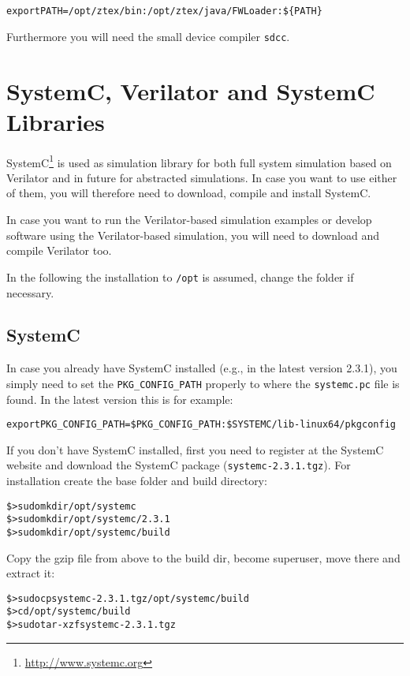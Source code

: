 \begin{alltt}
export PATH=/opt/ztex/bin:/opt/ztex/java/FWLoader:\$\{PATH\}
\end{alltt}

Furthermore you will need the small device compiler \verb|sdcc|.

\section{SystemC, Verilator and SystemC Libraries}

SystemC\footnote{\url{http://www.systemc.org}} is used as simulation
library for both full system simulation based on Verilator and in
future for abstracted simulations. In case you want to use either of
them, you will therefore need to download, compile and install
SystemC.

In case you want to run the Verilator-based simulation examples or
develop software using the Verilator-based simulation, you will need
to download and compile Verilator too.

In the following the installation to \verb|/opt| is assumed, change
the folder if necessary.

\subsection{SystemC}

In case you already have SystemC installed (e.g., in the latest
version 2.3.1), you simply need to set the \verb|PKG_CONFIG_PATH|
properly to where the \verb|systemc.pc| file is found. In the latest
version this is for example:

\begin{alltt}
export PKG_CONFIG_PATH=\$PKG_CONFIG_PATH:\$SYSTEMC/lib-linux64/pkgconfig
\end{alltt}

If you don't have SystemC installed, first you need to register at the
SystemC website and download the SystemC package
(\verb|systemc-2.3.1.tgz|). For installation create the base folder
and build directory:

\begin{alltt}
\$> sudo mkdir /opt/systemc
\$> sudo mkdir /opt/systemc/2.3.1
\$> sudo mkdir /opt/systemc/build
\end{alltt}

Copy the gzip file from above to the build dir, become superuser, move
there and extract it:

\begin{alltt}
\$> sudo cp systemc-2.3.1.tgz /opt/systemc/build
\$> cd /opt/systemc/build
\$> sudo tar -xzf systemc-2.3.1.tgz
\end{alltt}

